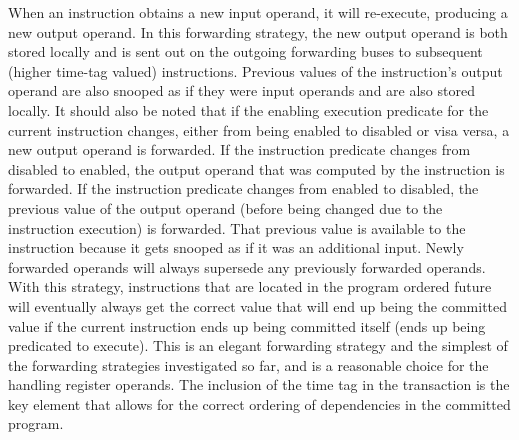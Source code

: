 \documentclass[10pt,twocolumn]{article}
\begin{document}
When an instruction obtains 
a new input operand, it will re-execute, producing a new
output operand.  In this forwarding strategy, the new output
operand is both stored locally 
and is sent out on the outgoing forwarding buses
to subsequent (higher time-tag valued) instructions.
Previous values of the instruction's output operand are also
snooped as if they were input operands and are also stored locally.
It should also be noted that if the enabling execution predicate
for the current instruction changes, either from being enabled
to disabled or visa versa, a new output operand is forwarded.
If the instruction predicate changes from disabled to enabled,
the output operand that was computed by the instruction is
forwarded.  If the instruction predicate changes from enabled
to disabled, the previous value of the output operand (before being
changed due to the instruction execution) is forwarded.
That previous value is available to the instruction because
it gets snooped as if it was an additional input.
Newly forwarded operands will always supersede any previously
forwarded operands.
With this strategy, instructions that are located in the program
ordered future will eventually always get the correct
value that will end up being the committed value if the
current instruction ends up being committed itself (ends
up being predicated to execute).
This is an elegant forwarding strategy and
the simplest of the forwarding strategies investigated so far, and
is a reasonable choice for the handling register operands.
The inclusion of the time tag in the transaction is the
key element that allows for the correct ordering of
dependencies in the committed program.
%
%
\vspace{-0.25in}
\end{document}
